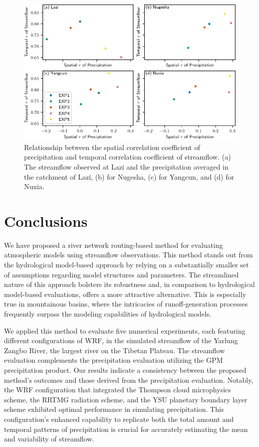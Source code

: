 \documentclass[draft]{agujournal2019}
\begin{document}
\begin{figure}[h!]
      \centering
      \noindent\includegraphics[width=140mm]{q_cc_p.pdf}
      \caption{Relationship between the spatial correlation coefficient of precipitation and temporal correlation coefficient of streamflow. (a) The streamflow observed at Lazi and the precipitation averaged in the catchment of Lazi, (b) for Nugesha, (c) for Yangcun, and (d) for Nuxia. \label{fig:q_cc_p}}
\end{figure}

\section{Conclusions}
\label{sec:conclusions}

We have proposed a river network routing-based method for evaluating atmospheric models using streamflow observations. This method stands out from the hydrological model-based approach by relying on a substantially smaller set of assumptions regarding model structures and parameters. The streamlined nature of this approach bolsters its robustness and, in comparison to hydrological model-based evaluations, offers a more attractive alternative. This is especially true in mountainous basins, where the intricacies of runoff-generation processes frequently surpass the modeling capabilities of hydrological models.

We applied this method to evaluate five numerical experiments, each featuring different configurations of WRF, in the simulated streamflow of the Yarlung Zangbo River, the largest river on the Tibetan Plateau. The streamflow evaluation complements the precipitation evaluation utilizing the GPM precipitation product. Our results indicate a consistency between the proposed method's outcomes and those derived from the precipitation evaluation. Notably, the WRF configuration that integrated the Thompson cloud microphysics scheme, the RRTMG radiation scheme, and the YSU planetary boundary layer scheme exhibited optimal performance in simulating precipitation. This configuration's enhanced capability to replicate both the total amount and temporal patterns of precipitation is crucial for accurately estimating the mean and variability of streamflow.
\end{document}
